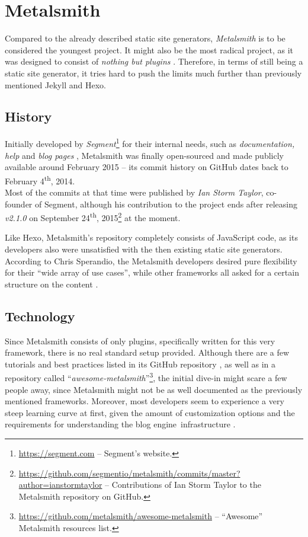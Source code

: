 \section{Metalsmith}
\label{sec:metalsmith}

Compared to the already described static site generators, \emph{Metalsmith} is to be considered the youngest project.
It might also be the most radical project, as it was designed to consist of \emph{nothing but plugins} \cite[31]{dhillon2016}. Therefore, in terms of still being a static site generator, it tries hard to push the limits much further than previously mentioned Jekyll and Hexo.

\subsection{History}
\label{sec:metalsmith-history}
Initially developed by \emph{Segment}\footnote{\url{https://segment.com} -- Segment's website.} for their internal needs, such as \emph{documentation, help} and \emph{blog pages} \cite{Metalsmith2015buildingblocks}, Metalsmith was finally open-sourced and made publicly available around February 2015 -- its commit history on GitHub dates back to February 4\textsuperscript{th}, 2014.\\
Most of the commits at that time were published by \emph{Ian Storm Taylor}, co-founder of Segment, although his contribution to the project ends after releasing \emph{v2.1.0} on September 24\textsuperscript{th}, 2015\footnote{\url{https://github.com/segmentio/metalsmith/commits/master?author=ianstormtaylor} -- Contributions of Ian Storm Taylor to the Metalsmith repository on GitHub.} at the moment.

Like Hexo, Metalsmith's repository completely consists of JavaScript code, as its developers also were unsatisfied with the then existing static site generators. According to Chris Sperandio, the Metalsmith developers desired pure flexibility for their ``wide array of use cases'', while other frameworks all asked for a certain structure on the content \cite{Metalsmith2015buildingblocks}.

\subsection{Technology}
\label{sec:metalsmith-technology}
Since Metalsmith consists of only plugins, specifically written for this very framework, there is no real standard setup provided. Although there are a few tutorials and best practices listed in its GitHub repository \cite{MetalsmithRepository}, as well as in a repository called ``\emph{awesome-metalsmith}''\footnote{\url{https://github.com/metalsmith/awesome-metalsmith} -- ``Awesome'' Metalsmith resources list.}, the initial dive-in might scare a few people away, since Metalsmith might not be as well documented as the previously mentioned frameworks. Moreover, most developers seem to experience a very steep learning curve at first, given the amount of customization options and the requirements for understanding the blog engine~infrastructure \cite[31]{dhillon2016}.

